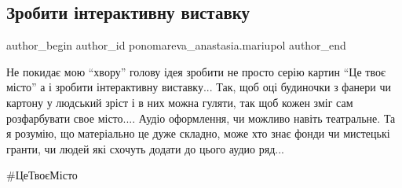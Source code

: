  
 
 
 
 

\subsection{Зробити інтерактивну виставку}
\label{sec:23_02_2020.fb.ponomareva_anastasia.mariupol.1.zrobiti__nteraktivnu}

\ifcmt
 author_begin
   author_id ponomareva_anastasia.mariupol
 author_end
\fi

Не покидає мою \enquote{хвору} голову ідея зробити не просто серію картин \enquote{Це твоє
місто} а і зробити інтерактивну виставку... Так, щоб оці будиночки з фанери чи
картону у людський зріст і в них можна гуляти, так щоб кожен зміг сам
розфарбувати свое місто.... Аудіо оформлення, чи можливо навіть театральне.  Та
я розумію, що матеріально це дуже складно, може хто знає фонди чи мистецькі
гранти, чи людей які схочуть додати до цього аудио ряд...

\#ЦеТвоєМісто
